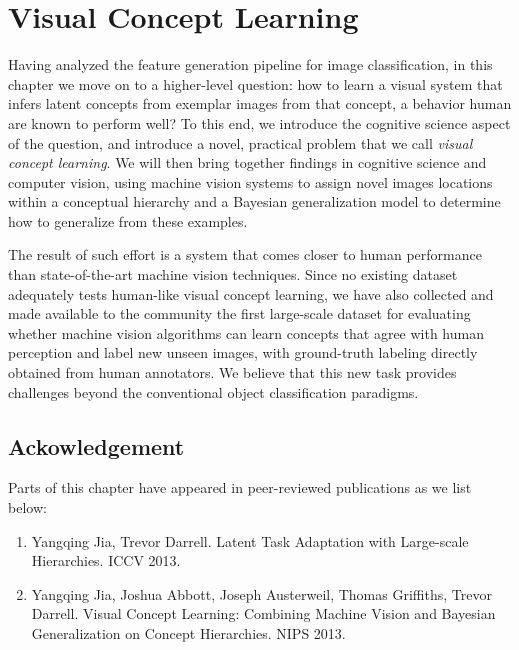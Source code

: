 \chapter{Visual Concept Learning}

Having analyzed the feature generation pipeline for image classification, in this chapter we move on to a higher-level question: how to learn a visual system that infers latent concepts from exemplar images from that concept, a behavior human are known to perform well? To this end, we introduce the cognitive science aspect of the question, and introduce a novel, practical problem that we call \emph{visual concept learning}. We will then bring together findings in cognitive science and computer vision, using machine vision systems to assign novel images locations within a conceptual hierarchy and a Bayesian generalization model to determine how to generalize from these examples.

The result of such effort is a system that comes closer to human performance than state-of-the-art machine vision techniques. Since no existing dataset adequately tests human-like visual concept learning, we have also collected and made available to the community the first large-scale dataset for evaluating whether machine vision algorithms can learn concepts that agree with human perception and label new unseen images, with ground-truth labeling directly obtained from human annotators. We believe that this new task provides challenges beyond the conventional object classification paradigms.







\section*{Ackowledgement}
Parts of this chapter have appeared in peer-reviewed publications as we list below:
\begin{enumerate}
\item Yangqing Jia, Trevor Darrell. Latent Task Adaptation with Large-scale Hierarchies. ICCV 2013.
\item Yangqing Jia, Joshua Abbott, Joseph Austerweil, Thomas Griffiths, Trevor Darrell. Visual Concept Learning: Combining Machine Vision and Bayesian Generalization on Concept Hierarchies. NIPS 2013.
\end{enumerate}